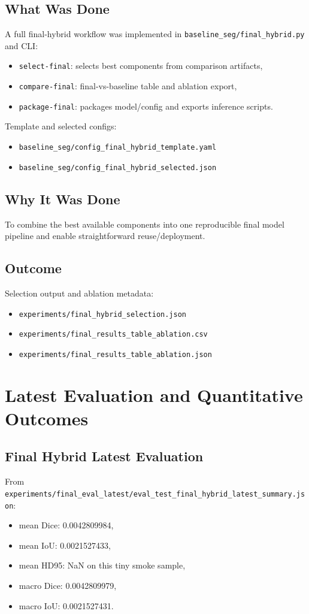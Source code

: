 \documentclass[11pt,a4paper]{article}
\begin{document}
\subsection{What Was Done}
A full final-hybrid workflow was implemented in \texttt{baseline\_seg/final\_hybrid.py} and CLI:
\begin{itemize}[leftmargin=1.5em]
  \item \texttt{select-final}: selects best components from comparison artifacts,
  \item \texttt{compare-final}: final-vs-baseline table and ablation export,
  \item \texttt{package-final}: packages model/config and exports inference scripts.
\end{itemize}

Template and selected configs:
\begin{itemize}[leftmargin=1.5em]
  \item \texttt{baseline\_seg/config\_final\_hybrid\_template.yaml}
  \item \texttt{baseline\_seg/config\_final\_hybrid\_selected.json}
\end{itemize}

\subsection{Why It Was Done}
To combine the best available components into one reproducible final model pipeline and enable straightforward reuse/deployment.

\subsection{Outcome}
Selection output and ablation metadata:
\begin{itemize}[leftmargin=1.5em]
  \item \texttt{experiments/final\_hybrid\_selection.json}
  \item \texttt{experiments/final\_results\_table\_ablation.csv}
  \item \texttt{experiments/final\_results\_table\_ablation.json}
\end{itemize}

\section{Latest Evaluation and Quantitative Outcomes}
\subsection{Final Hybrid Latest Evaluation}
From \texttt{experiments/final\_eval\_latest/eval\_test\_final\_hybrid\_latest\_summary.json}:
\begin{itemize}[leftmargin=1.5em]
  \item mean Dice: 0.0042809984,
  \item mean IoU: 0.0021527433,
  \item mean HD95: NaN on this tiny smoke sample,
  \item macro Dice: 0.0042809979,
  \item macro IoU: 0.0021527431.
\end{itemize}
\end{document}
